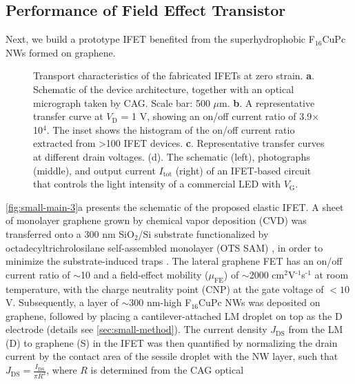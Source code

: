 \subsection{Performance of Field Effect Transistor }
\label{sec:small-field-effect-trans}

Next, we build a prototype IFET benefited from the superhydrophobic
F$_{16}$CuPc NWs formed on graphene.
%
\begin{figure}[!htbp]
  \centering
  \caption{\label{fig:small-main-3} Transport characteristics of the
    fabricated IFETs at zero strain. \textbf{a}. Schematic of the
    device architecture, together with an optical micrograph taken by
    CAG. Scale bar: 500 \(\mu\)m. \textbf{b}. A representative
    transfer curve at \(V_{\mathrm{D}}\) = 1 V, showing an on/off
    current ratio of 3.9\(\times{}\)10\(^{\text{4}}\). The inset shows
    the histogram of the on/off current ratio extracted from
    \textgreater{}100 IFET devices. \textbf{c}. Representative
    transfer curves at different drain voltages. (d). The schematic
    (left), photographs (middle), and output current
    \(I_{\mathrm{tot}}\) (right) of an IFET-based circuit that
    controls the light intensity of a commercial LED with
    \(V_{\mathrm{G}}\).}
\end{figure}
\autoref{fig:small-main-3}a presents the
schematic of the proposed elastic IFET.
%
A sheet of monolayer graphene grown by chemical vapor deposition (CVD)
was transferred onto a 300 nm SiO\(_{\text{2}}\)/Si substrate
functionalized by octadecyltrichrolosilane self-assembled monolayer
(OTS SAM) \cite{Yan_2011}, in order to minimize the substrate-induced
traps \cite{Wang_2011_quanti_doping_gr}.  The lateral graphene FET has
an on/off current ratio of \(\sim\)10 and a field-effect mobility
(\(\mu_{\mathrm{FE}}\)) of \(\sim\)2000
cm\(^{\text{2}}\)V\(^{\text{-1}}\)s\(^{\text{-1}}\) at room
temperature, with the charge neutrality point (CNP) at the gate
voltage of $<10$ V. Subsequently, a layer of \(\sim\)300 nm-high
F\(_{\text{16}}\)CuPc NWs was deposited on graphene, followed by
placing a cantilever-attached LM droplet on top as the D electrode
(details see \autoref{sec:small-method}).
%
The current density \(J_{\mathrm{DS}}\) from the LM (D) to graphene
(S) in the IFET was then quantified by normalizing the drain current
by the contact area of the sessile droplet with the NW layer, such
that
\(J_{\mathrm{DS}} = {\displaystyle \frac{I_{\mathrm{DS}}}{\pi
    R^{2}}}\), where \(R\) is determined from the CAG optical
